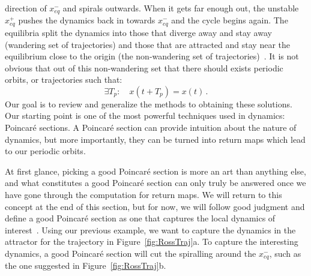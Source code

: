 \documentclass[10pt,letter]{article}
\begin{document}
direction of $x_{eq}^{-}$ and spirals outwards.  When it gets far enough
out, the unstable $x_{eq}^{+}$ pushes the dynamics back in towards
$x_{eq}^{-}$ and the cycle begins again.  The equilibria split the
dynamics into those that diverge away and stay away (wandering set of
trajectories) and those that are attracted and stay near the equilibrium
close to the origin (the non-wandering set of trajectories)~\cite{CB}. It
is not obvious that out of this non-wandering set that there should
exists periodic orbits, or trajectories such that:
\begin{equation}
\exists T_p : \quad  x(t+T_p) = x(t) \,.
  \label{eq:PerTraj}
\end{equation}
Our goal is to review and generalize the methods to obtaining these
solutions.  Our starting point is one of the most powerful techniques
used in dynamics: Poincar\'e sections.  A Poincar\'e section can provide
intuition about the nature of dynamics, but more importantly, they can be
turned into return maps which lead to our periodic orbits.

At first glance, picking a good Poincar\'e section is more an art than
anything else, and what constitutes a good Poincar\'e section can only
truly be answered once we have gone through the computation for return
maps.  We will return to this concept at the end of this section, but for
now, we will follow good judgment and define a good Poincar\'e section as
one that captures the local dynamics of interest~\cite{CB}.  Using our
previous example, we want to capture the dynamics in the attractor for
the trajectory in Figure~\ref{fig:RossTraj}a.  To capture the interesting
dynamics, a good Poincar\'e section will cut the spiralling around the
$x_{eq}^{-}$, such as the one suggested in Figure~\ref{fig:RossTraj}b.
\end{document}
